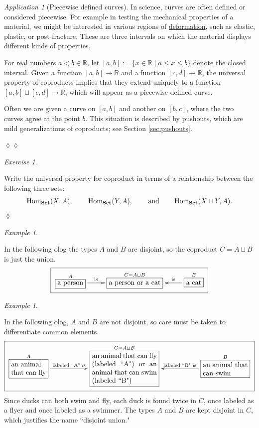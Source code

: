 \documentclass{book}
\def\tn{\textnormal}
\def\RR{{\mathbb R}}
\def\Hom{\tn{Hom}}
\def\hsp{\hspace{.3in}}
\def\to{\rightarrow}
\def\|{{\;|\;}}
\def\rr{\raggedright}
\newcommand{\LA}[2]{\ar[#1]^-{\tn {#2}}}
\newcommand{\LAL}[2]{\ar[#1]_-{\tn {#2}}}
\newcommand{\obox}[3]{\stackrel{#1}{\fbox{\parbox{#2}{#3}}}}
\newcommand{\smbox}[2]{\stackrel{#1}{\fbox{#2}}}
\def\Set{{\bf Set}}
\theoremstyle{remark}
\newtheorem{example}[subsubsection]{Example}
\newtheorem{exc}[subsubsection]{Exercise}
\newenvironment{exercise}{\begin{exc}}{\hspace*{\fill}$\lozenge$\end{exc}}
\newtheorem{app}[subsubsection]{Application}
\newenvironment{application}{\begin{app}}{\hspace*{\fill}$\lozenge\lozenge$\end{app}}
\theoremstyle{definition}
\begin{document}
\begin{application}[Piecewise defined curves]

In science, curves are often defined or considered piecewise. For example in testing the mechanical properties of a material, we might be interested in various regions of \href{http://en.wikipedia.org/wiki/Deformation_(engineering)}{deformation}, such as elastic, plastic, or post-fracture. These are three intervals on which the material displays different kinds of properties. 

For real numbers $a<b\in\RR$, let $[a,b]:=\{x\in\RR\|a\leq x\leq b\}$ denote the closed interval. Given a function $[a,b]\to\RR$ and a function $[c,d]\to\RR$, the universal property of coproducts implies that they extend uniquely to a function $[a,b]\sqcup[c,d]\to\RR$, which will appear as a piecewise defined curve.

Often we are given a curve on $[a,b]$ and another on $[b,c]$, where the two curves agree at the point $b$. This situation is described by pushouts, which are mild generalizations of coproducts; see Section \ref{sec:pushouts}.

\end{application}

\begin{exercise}\label{exc:coprod}

Write the universal property for coproduct in terms of a relationship between the following three sets: $$\Hom_{\Set}(X,A), \hsp \Hom_\Set(Y,A), \hsp \text{and} \hsp\Hom_\Set(X\sqcup Y,A).$$ 
\end{exercise}

\begin{example}\label{ex:coproduct1}

In the following olog the types $A$ and $B$ are disjoint, so the coproduct $C=A\sqcup B$ is just the union. $$\fbox{\xymatrix{\smbox{A}{a person}\LA{r}{is}&\smbox{C=A\sqcup B}{a person or a cat}&\smbox{B}{a cat}\LAL{l}{is}}}$$

\end{example}

\begin{example}\label{ex:coproduct2}

In the following olog, $A$ and $B$ are not disjoint, so care must be taken to differentiate common elements. $$\fbox{\xymatrixnocompile{\obox{A}{.7in}{\rr an animal that can fly}\LA{rr}{labeled ``A" is}&&\obox{C=A\sqcup B}{1.3in}{an animal that can fly (labeled ``A") or an animal that can swim (labeled ``B")}&&\obox{B}{.9in}{\rr an animal that can swim}\LAL{ll}{labeled ``B" is}}}$$  Since ducks can both swim and fly, each duck is found twice in $C$, once labeled as a flyer and once labeled as a swimmer.  The types $A$ and $B$ are kept disjoint in $C$, which justifies the name ``disjoint union."

\end{example}
\end{document}

